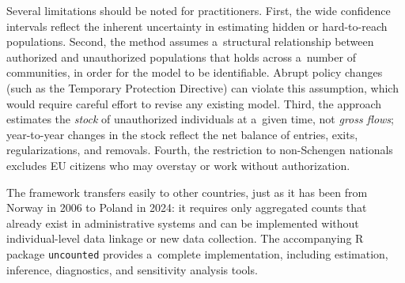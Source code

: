 Several limitations should be noted for practitioners. First, the wide confidence intervals reflect the inherent uncertainty in estimating hidden or hard-to-reach populations. Second, the method assumes a~structural relationship between authorized and unauthorized populations that holds across a~number of communities, in order for the model to be identifiable. Abrupt policy changes (such as the Temporary Protection Directive) can violate this assumption, which would require careful effort to revise any existing model. Third, the approach estimates the \emph{stock} of unauthorized individuals at a~given time, not \emph{gross flows}; year-to-year changes in the stock reflect the net balance of entries, exits, regularizations, and removals. Fourth, the
restriction to non-Schengen nationals excludes EU citizens who may overstay or work without authorization.


The framework transfers easily to other countries, just as it has been from Norway in 2006 to Poland in 2024: it requires only aggregated counts that already exist in administrative systems and can be implemented without individual-level data linkage or new data collection. The accompanying R package \texttt{uncounted} provides a~complete implementation, including estimation, inference, diagnostics, and sensitivity analysis tools.


\renewcommand{\refname}{References}

% 

\renewcommand{\refname}{References}
\begingroup
\singlespacing

\endgroup



\appendix

\singlespacing


